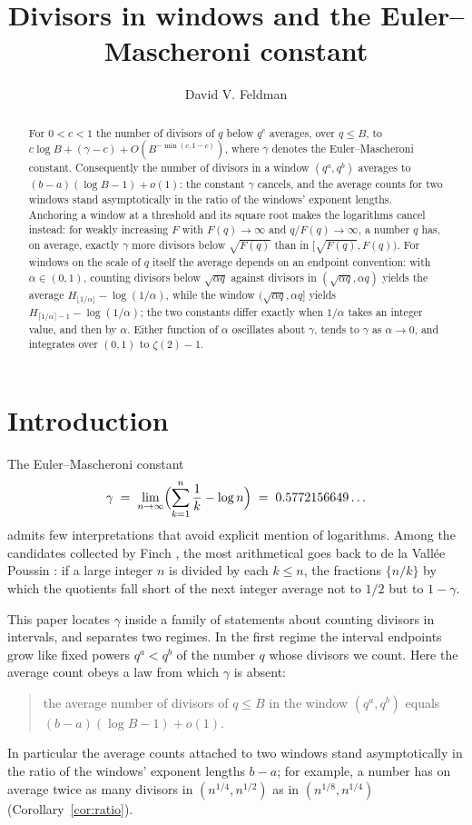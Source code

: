 \documentclass[11pt]{amsart}
\title{Divisors in windows and the Euler--Mascheroni constant}
\author{David V. Feldman}
\theoremstyle{remark}
\newcommand{\eul}{\gamma}
\begin{document}
\begin{abstract}
For $0<c<1$ the number of divisors of $q$ below $q^{c}$ averages, over
$q\le B$, to $c\log B+(\eul-c)+O(B^{-\min(c,1-c)})$, where $\eul$ denotes
the Euler--Mascheroni constant.  Consequently the number of divisors in a
window $(q^{a},q^{b})$ averages to $(b-a)(\log B-1)+o(1)$: the constant
$\eul$ cancels, and the average counts for two windows stand
asymptotically in the ratio of the windows' exponent lengths.  Anchoring
a window at a threshold and its square root makes the logarithms cancel
instead: for weakly increasing $F$ with $F(q)\to\infty$ and
$q/F(q)\to\infty$, a number $q$ has, on average, exactly $\eul$ more
divisors below $\sqrt{F(q)}$ than in $[\sqrt{F(q)},F(q))$.  For windows
on the scale of $q$ itself the average depends on an endpoint
convention: with $\alpha\in(0,1)$, counting divisors below
$\sqrt{\alpha q}$ against divisors in $(\sqrt{\alpha q},\alpha q)$
yields the average $H_{\lfloor 1/\alpha\rfloor}-\log(1/\alpha)$, while
the window $(\sqrt{\alpha q},\alpha q]$ yields
$H_{\lceil 1/\alpha\rceil-1}-\log(1/\alpha)$; the two constants differ
exactly when $1/\alpha$ takes an integer value, and then by $\alpha$.
Either function of $\alpha$ oscillates about $\eul$, tends to $\eul$ as
$\alpha\to0$, and integrates over $(0,1)$ to $\zeta(2)-1$.
\end{abstract}

\maketitle

\section{Introduction}\label{sec:intro}

The Euler--Mascheroni constant
\[
\eul \;=\; \lim_{n\to\infty}\Bigl(\sum_{k=1}^{n}\frac1k-\log n\Bigr)
\;=\;0.5772156649\ldots
\]
admits few interpretations that avoid explicit mention of logarithms.
Among the candidates collected by Finch \cite{Finch}, the most
arithmetical goes back to de la Vall\'ee Poussin \cite{dlVP}: if a large
integer $n$ is divided by each $k\le n$, the fractions $\{n/k\}$ by which
the quotients fall short of the next integer average not to $1/2$ but to
$1-\eul$.

This paper locates $\eul$ inside a family of statements about counting
divisors in intervals, and separates two regimes.  In the first regime
the interval endpoints grow like fixed powers $q^{a}<q^{b}$ of the
number $q$ whose divisors we count.  Here the average count obeys a law
from which $\eul$ is absent:
\begin{quotation}
\noindent
the average number of divisors of $q\le B$ in the window
$(q^{a},q^{b})$ equals $(b-a)(\log B-1)+o(1)$.
\end{quotation}
In particular the average counts attached to two windows stand
asymptotically in the ratio of the windows' exponent lengths $b-a$; for
example, a number has on average twice as many divisors in
$(n^{1/4},n^{1/2})$ as in $(n^{1/8},n^{1/4})$
(Corollary~\ref{cor:ratio}).
\end{document}

